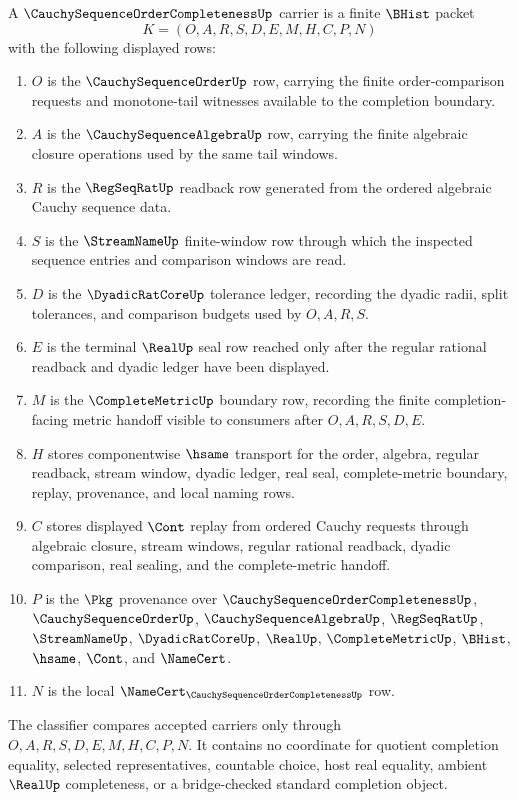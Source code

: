 \begin{definition}
\label{def:cauchy-sequence-order-completeness-carrier}
A $\CauchySequenceOrderCompletenessUp$ carrier is a finite $\BHist$ packet
$$
K=(O,A,R,S,D,E,M,H,C,P,N)
$$
with the following displayed rows:
\begin{enumerate}
\item $O$ is the $\CauchySequenceOrderUp$ row, carrying the finite order-comparison requests and monotone-tail witnesses available to the completion boundary.
\item $A$ is the $\CauchySequenceAlgebraUp$ row, carrying the finite algebraic closure operations used by the same tail windows.
\item $R$ is the $\RegSeqRatUp$ readback row generated from the ordered algebraic Cauchy sequence data.
\item $S$ is the $\StreamNameUp$ finite-window row through which the inspected sequence entries and comparison windows are read.
\item $D$ is the $\DyadicRatCoreUp$ tolerance ledger, recording the dyadic radii, split tolerances, and comparison budgets used by $O,A,R,S$.
\item $E$ is the terminal $\RealUp$ seal row reached only after the regular rational readback and dyadic ledger have been displayed.
\item $M$ is the $\CompleteMetricUp$ boundary row, recording the finite completion-facing metric handoff visible to consumers after $O,A,R,S,D,E$.
\item $H$ stores componentwise $\hsame$ transport for the order, algebra, regular readback, stream window, dyadic ledger, real seal, complete-metric boundary, replay, provenance, and local naming rows.
\item $C$ stores displayed $\Cont$ replay from ordered Cauchy requests through algebraic closure, stream windows, regular rational readback, dyadic comparison, real sealing, and the complete-metric handoff.
\item $P$ is the $\Pkg$ provenance over $\CauchySequenceOrderCompletenessUp$, $\CauchySequenceOrderUp$, $\CauchySequenceAlgebraUp$, $\RegSeqRatUp$, $\StreamNameUp$, $\DyadicRatCoreUp$, $\RealUp$, $\CompleteMetricUp$, $\BHist$, $\hsame$, $\Cont$, and $\NameCert$.
\item $N$ is the local $\NameCert_{\CauchySequenceOrderCompletenessUp}$ row.
\end{enumerate}
The classifier compares accepted carriers only through $O,A,R,S,D,E,M,H,C,P,N$. It contains no coordinate for quotient completion equality, selected representatives, countable choice, host real equality, ambient $\RealUp$ completeness, or a bridge-checked standard completion object.
\end{definition}

